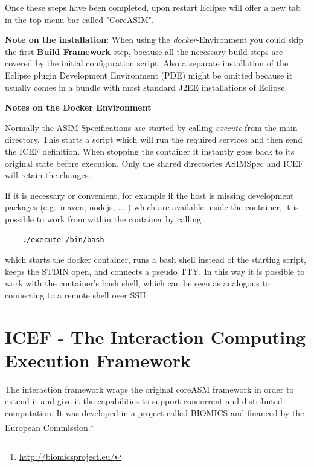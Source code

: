 Once these steps have been completed, upon restart Eclipse will offer a new tab in the top menu bar called "CoreASIM".

\textbf{Note on the installation}: When using the \textit{docker}-Environment you could skip the first \textbf{Build Framework} step, because all the necessary build steps are covered by the initial configuration script. Also a separate installation of the Eclipse plugin Development Environment (PDE) might be omitted because it usually comes in a bundle with most standard J2EE installations of Eclipse.

\textbf{Notes on the Docker Environment}
\label{sec_inner:note-docker}

Normally the ASIM Specifications are started by calling \textit{execute} from the main directory. This starts a script which will run the required services and then send the ICEF definition. When stopping the container it instantly goes back to its original state before execution. Only the shared directories ASIMSpec and ICEF will retain the changes.

If it is necessary or convenient, for example if the host is missing development packages (e.g.\ maven, nodejs, ... ) which are available inside the container, it is possible to work from within the container by calling
\begin{lstlisting}
	./execute /bin/bash
\end{lstlisting}
which starts the docker container, runs a bash shell instead of the starting script, keeps the STDIN open, and connects a pseudo TTY. In this way it is possible to work with the container's bash shell, which can be seen as analogous to connecting to a remote shell over SSH.

\section{ICEF - The Interaction Computing Execution Framework}
\label{sec:icef-intro}
The interaction framework wraps the original coreASM framework in order to extend it and give it the capabilities to support concurrent and distributed computation. It was developed in a project called BIOMICS and financed by the European Commission.\footnote{\url{http://biomicsproject.eu/}}

